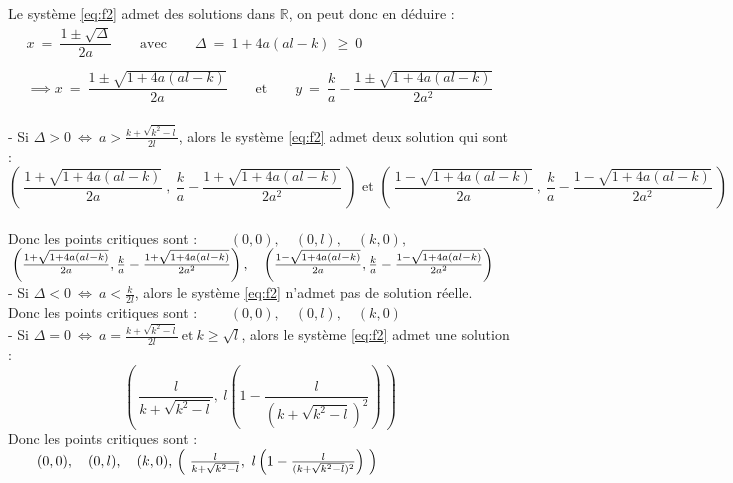 \documentclass{article}
\begin{document}
Le système \eqref{eq:f2} admet des solutions dans $\mathbb{R}$, on peut donc en déduire :
\begin{equation*}
\begin{array}{cc}
    x\ =\ \dfrac{1 \pm \sqrt{\Delta}}{2a} \qquad \text{avec} \qquad \Delta\ =\ 1 + 4a(al -k)\ \geqslant\ 0\\\\
    \implies
    x\ =\ \dfrac{1 \pm \sqrt{1 + 4a(al - k)}}{2a}
    \qquad \text{et} \qquad
    y\ =\ \dfrac{k}{a} - \dfrac{1 \pm \sqrt{1 + 4a(al -k)}}{2a^2}
\end{array}
\end{equation*}\\

\newpage
- Si $\Delta > 0\ \Leftrightarrow\ a > \frac{k + \sqrt{k^2 - l} }{2l}$, alors le système \eqref{eq:f2} admet deux solution qui sont : 
\begin{equation*}
    \left(\ \dfrac{1 + \sqrt{1 + 4a(al -k)}}{2a}\ ,\ \dfrac{k}{a} - \dfrac{1 + \sqrt{1 + 4a(al -k)}}{2a^2}\ \right)
    \text{ et }
    \left(\ \dfrac{1 - \sqrt{1 + 4a(al -k)}}{2a}\ ,\ \dfrac{k}{a} - \dfrac{1 - \sqrt{1 + 4a(al -k)}}{2a^2}\ \right)
\end{equation*}\\

\qquad Donc les points critiques sont :
$\qquad (0,0),\quad (0,l),\quad (k,0),$\\

$\phantom{} \hfill \left(\frac{1 + \sqrt{1 + 4a(al -k)}}{2a}, \frac{k}{a} - \frac{1 + \sqrt{1 + 4a(al -k)}}{2a^2} \right),
\quad \left(\frac{1 - \sqrt{1 + 4a(al -k)}}{2a}, \frac{k}{a} - \frac{1 - \sqrt{1 + 4a(al -k)}}{2a^2}\right) \hfill$\\

\vspace{1cm}
- Si $\Delta < 0\ \Leftrightarrow\ a < \frac{k}{2l}$, alors le système \eqref{eq:f2} n'admet pas de solution réelle.\\

Donc les points critiques sont : $\qquad (0,0),\quad (0,l),\quad (k,0)$ \\

\vspace{1cm}
- Si $\Delta = 0\ \Leftrightarrow\ a = \frac{k + \sqrt{k^2 - l} }{2l}\ \text{et}\ k \geqslant \sqrt{l}$, alors le système \eqref{eq:f2} admet une solution : 
\begin{equation*}
    \left(\ \dfrac{l}{k + \sqrt{k^2 - l}},\ l\left(1 - \dfrac{l}{(k + \sqrt{k^2 - l})^2} \right)\ \right)
\end{equation*}
\qquad Donc les points critiques sont : $\qquad (0,0),\quad (0,l),\quad (k,0), \\\\
\phantom{} \hfill \left(\ \frac{l}{k + \sqrt{k^2 - l}},\ l\left(1 - \frac{l}{(k + \sqrt{k^2 - l})^2} \right)\ \right) \hfill$
\end{document}
